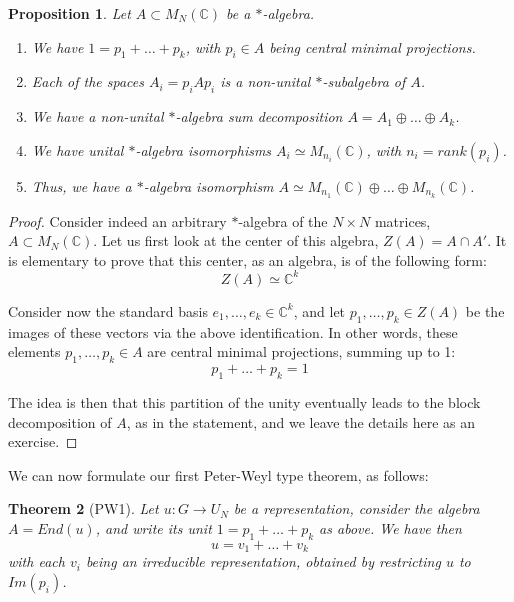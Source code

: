 \documentclass[12pt]{amsbook}
\newtheorem{theorem}{Theorem}[chapter]
\newtheorem{proposition}[theorem]{Proposition}
\begin{document}
\begin{proposition}
Let $A\subset M_N(\mathbb C)$ be a $*$-algebra.
\begin{enumerate}
\item We have $1=p_1+\ldots+p_k$, with $p_i\in A$ being central minimal projections.

\item Each of the spaces $A_i=p_iAp_i$ is a non-unital $*$-subalgebra of $A$.

\item We have a non-unital $*$-algebra sum decomposition $A=A_1\oplus\ldots\oplus A_k$.

\item We have unital $*$-algebra isomorphisms $A_i\simeq M_{n_i}(\mathbb C)$, with $n_i=rank(p_i)$.

\item Thus, we have a $*$-algebra isomorphism $A\simeq M_{n_1}(\mathbb C)\oplus\ldots\oplus M_{n_k}(\mathbb C)$.
\end{enumerate}
\end{proposition}

\begin{proof}
Consider indeed an arbitrary $*$-algebra of the $N\times N$ matrices, $A\subset M_N(\mathbb C)$. Let us first look at the center of this algebra, $Z(A)=A\cap A'$. It is elementary to prove that this center, as an algebra, is of the following form:
$$Z(A)\simeq\mathbb C^k$$

Consider now the standard basis $e_1,\ldots,e_k\in\mathbb C^k$, and let  $p_1,\ldots,p_k\in Z(A)$ be the images of these vectors via the above identification. In other words, these elements $p_1,\ldots,p_k\in A$ are central minimal projections, summing up to 1:
$$p_1+\ldots+p_k=1$$

The idea is then that this partition of the unity eventually leads to the block decomposition of $A$, as in the statement, and we leave the details here as an exercise.
\end{proof}

We can now formulate our first Peter-Weyl type theorem, as follows:


\begin{theorem}[PW1]
Let $u:G\to U_N$ be a representation, consider the algebra $A=End(u)$, and write its unit $1=p_1+\ldots+p_k$ as above. We have then 
$$u=v_1+\ldots+v_k$$
with each $v_i$ being an irreducible representation, obtained by restricting $u$ to $Im(p_i)$.
\end{theorem}
\end{document}
